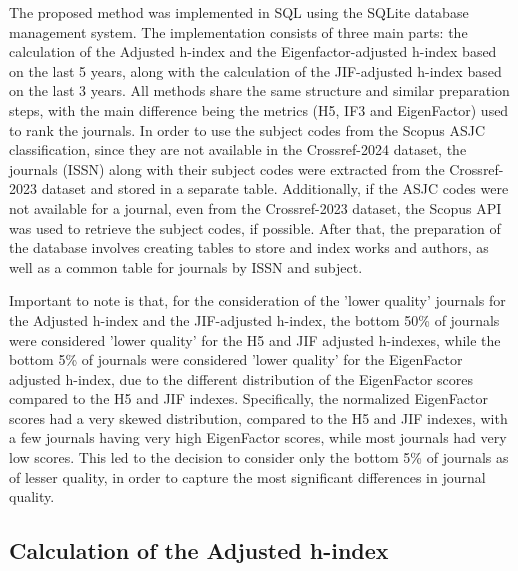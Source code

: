The proposed method was implemented in SQL using the SQLite database management
system. The implementation consists of three main parts: the calculation of the
Adjusted h-index and the Eigenfactor-adjusted h-index based on the last 5
years, along with the calculation of the JIF-adjusted h-index based on the last
3 years. All methods share the same structure and similar preparation steps,
with the main difference being the metrics (H5, IF3 and EigenFactor) used to
rank the journals. In order to use the subject codes from the Scopus ASJC
classification, since they are not available in the Crossref-2024 dataset, the
journals (ISSN) along with their subject codes were extracted from the
Crossref-2023 dataset and stored in a separate table. Additionally, if the ASJC
codes were not available for a journal, even from the Crossref-2023 dataset,
the Scopus API was used to retrieve the subject codes, if possible. After that,
the preparation of the database involves creating tables to store and index
works and authors, as well as a common table for journals by ISSN and subject.

Important to note is that, for the consideration of the 'lower quality'
journals for the Adjusted h-index and the JIF-adjusted h-index, the bottom 50\%
of journals were considered 'lower quality' for the H5 and JIF adjusted
h-indexes, while the bottom 5\% of journals were considered 'lower quality' for
the EigenFactor adjusted h-index, due to the different distribution of the
EigenFactor scores compared to the H5 and JIF indexes. Specifically, the
normalized EigenFactor scores had a very skewed distribution, compared to the
H5 and JIF indexes, with a few journals having very high EigenFactor scores,
while most journals had very low scores. This led to the decision to consider
only the bottom 5\% of journals as of lesser quality, in order to capture the
most significant differences in journal quality. %

\subsection{Calculation of the Adjusted h-index}

